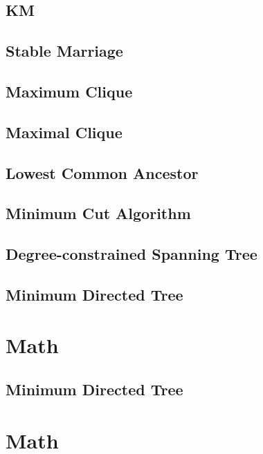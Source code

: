 \documentclass[a4paper,5pt,twocolumn,titlepage]{article}
\begin{document}
\begin{CJK*}{GBK}{song}
\subsection{KM}

\subsection{Stable Marriage}

\subsection{Maximum Clique}

\subsection{Maximal Clique}

\subsection{Lowest Common Ancestor}

\subsection{Minimum Cut Algorithm}

\subsection{Degree-constrained Spanning Tree}

\subsection{Minimum Directed Tree}

\section{Math}
\subsection{Minimum Directed Tree}

\section{Math}

\end{CJK*}
\end{document}
